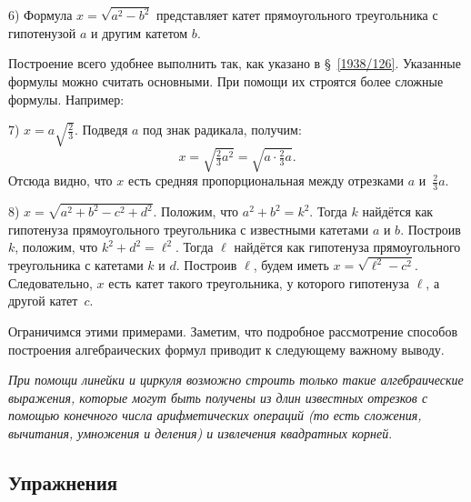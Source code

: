 \documentclass[twoside]{book}
\begin{document}
6) Формула $x=\sqrt{a^2-b^2}$ представляет катет прямоугольного треугольника с гипотенузой $a$ и другим катетом $b$.

Построение всего удобнее выполнить так, как указано в §~\ref{1938/126}.
Указанные формулы можно считать основными.
При помощи их строятся более сложные формулы.
Например:

7) $x=a\sqrt{\frac23}$.
Подведя $a$ под знак радикала, получим:
\[x=\sqrt{\tfrac23a^2}=\sqrt{a\cdot\tfrac23a}.\]
Отсюда видно, что $x$ есть средняя пропорциональная между отрезками $a$ и~$\tfrac23a$.

8) $x=\sqrt{a^2 + b^2 - c^2 + d^2}$.
Положим, что  $a^2+b^2=k^2$.
Тогда $k$ найдётся как гипотенуза прямоугольного треугольника с известными катетами $a$ и $b$.
Построив $k$, положим, что $k^2+d^2=\ell^2$.
Тогда $\ell$ найдётся как гипотенуза прямоугольного треугольника с катетами $k$ и $d$.
Построив $\ell$, будем иметь $x=\sqrt{\ell^2-c^2}$.
Следовательно, $x$ есть катет такого треугольника, у которого гипотенуза $\ell$, а другой катет~$c$.

Ограничимся этими примерами.
Заметим, что подробное рассмотрение способов построения алгебраических формул приводит к следующему важному выводу.

\emph{При помощи линейки и циркуля возможно строить только такие алгебраические выражения, которые могут быть получены из длин известных отрезков с помощью конечного числа арифметических операций \emph{(то есть сложения, вычитания, умножения и деления)} 
и извлечения квадратных корней}.

\subsection*{Упражнения}

\begin{center}
\end{center}
\end{document}
